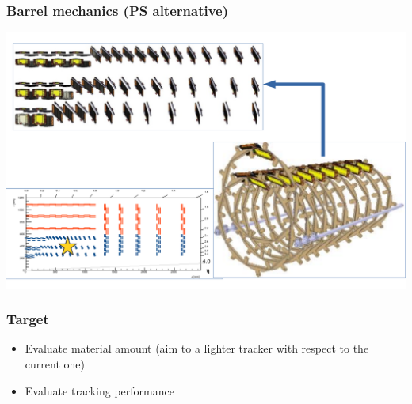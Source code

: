 \documentclass[pdftex, 11pt]{beamer}
\begin{document}
\begin{frame}
  \frametitle{Barrel mechanics (PS alternative)}
  \begin{center}
    \includegraphics[width=\textwidth]{img/mechanics4.pdf}
  \end{center}
\end{frame}

\begin{frame}
  \frametitle{Target}
  \begin{itemize}
  \item Evaluate \alert{material} amount (aim to a lighter tracker with respect to the current one)
    \pause
  \item Evaluate tracking \alert{performance}
  \end{itemize}
\end{frame}
\end{document}
